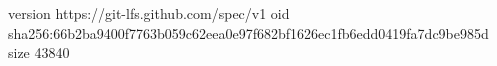 version https://git-lfs.github.com/spec/v1
oid sha256:66b2ba9400f7763b059c62eea0e97f682bf1626ec1fb6edd0419fa7dc9be985d
size 43840
